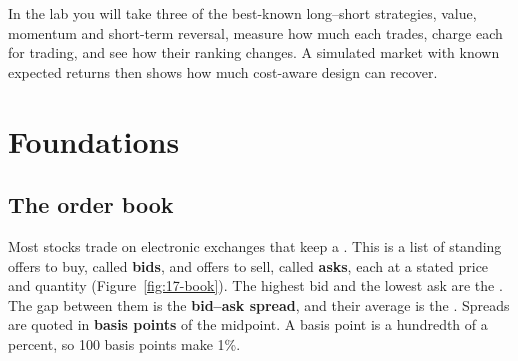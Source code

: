 In the lab you will take three of the best-known long--short strategies, value, momentum and short-term reversal, measure how much each trades, charge each for trading, and see how their ranking changes. A simulated market with known expected returns then shows how much cost-aware design can recover.

\section{Foundations}
\label{sec:17-foundations}

\subsection{The order book}

Most stocks trade on electronic exchanges that keep a . This is a list of standing offers to buy, called \textbf{bids}, and offers to sell, called \textbf{asks}, each at a stated price and quantity (Figure~\ref{fig:17-book}). The highest bid and the lowest ask are the . The gap between them is the \textbf{bid--ask spread}, and their average is the . Spreads are quoted in \textbf{basis points} of the midpoint. A basis point is a hundredth of a percent, so 100 basis points make 1\%.


